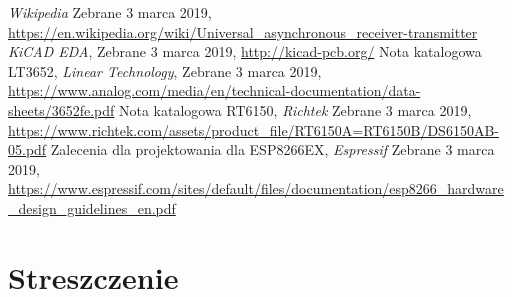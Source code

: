 \documentclass[12pt,a4paper,oneside]{memoir}
\begin{document}
\begin{thebibliography}{16}
	\textit{Wikipedia}
	Zebrane 3 marca 2019,
	\url{https://en.wikipedia.org/wiki/Universal_asynchronous_receiver-transmitter}	
	\textit{KiCAD EDA},
	Zebrane 3 marca 2019,
	\url{http://kicad-pcb.org/}
	Nota katalogowa LT3652,
	\textit{Linear Technology},
	Zebrane 3 marca 2019,
	\url{https://www.analog.com/media/en/technical-documentation/data-sheets/3652fe.pdf}
	Nota katalogowa RT6150,
	\textit{Richtek}
	Zebrane 3 marca 2019,
	\url{https://www.richtek.com/assets/product_file/RT6150A=RT6150B/DS6150AB-05.pdf}
	Zalecenia dla projektowania dla ESP8266EX,
	\textit{Espressif}
	Zebrane 3 marca 2019,
	\url{https://www.espressif.com/sites/default/files/documentation/esp8266_hardware_design_guidelines_en.pdf}
\end{thebibliography}

\newpage
\chapter{Streszczenie} 
\end{document}

